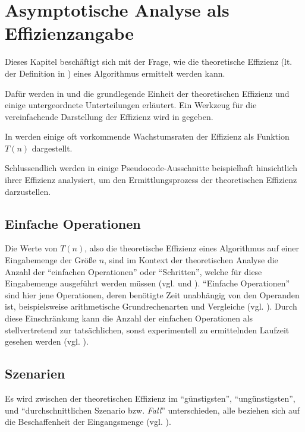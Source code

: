 \chapter{Asymptotische Analyse als Effizienzangabe}
\label{cha:asymptotic-analysis}

Dieses Kapitel beschäftigt sich mit der Frage, wie die theoretische Effizienz (lt. der Definition in ) eines Algorithmus ermittelt werden kann.

Dafür werden in  und  die grundlegende Einheit der theoretischen Effizienz und einige untergeordnete Unterteilungen erläutert. Ein Werkzeug für die vereinfachende Darstellung der Effizienz wird in  gegeben.

In  werden einige oft vorkommende Wachstumsraten der Effizienz als Funktion $T(n)$ dargestellt.

Schlussendlich werden in  einige Pseudocode-Ausschnitte beispielhaft hinsichtlich ihrer Effizienz analysiert, um den Ermittlungsprozess der theoretischen Effizienz darzustellen.

\section{Einfache Operationen}
\label{sec:einfache-operationen}

Die Werte von $T(n)$, also die theoretische Effizienz eines Algorithmus auf einer Eingabemenge der Größe $n$, sind im Kontext der theoretischen Analyse die Anzahl der \enquote{einfachen Operationen} oder \enquote{Schritten}, welche für diese Eingabemenge ausgeführt werden müssen (vgl. \cite[25]{clrs2001} und \cite[18f]{hsr1997}). \enquote{Einfache Operationen} sind hier jene Operationen, deren benötigte Zeit unabhängig von den Operanden ist, beispielsweise arithmetische Grundrechenarten und Vergleiche (vgl. \cite[55]{sha2011}). Durch diese Einschränkung kann die Anzahl der einfachen Operationen als stellvertretend zur tatsächlichen, sonst experimentell zu ermittelnden Laufzeit gesehen werden (vgl. \cite[55]{sha2011}).

\section{Szenarien}
\label{sec:asymptotic-cases}

Es wird zwi\-schen der theoretischen Effizienz im \enquote{günstigsten}, \enquote{ungünstigsten}, und \enquote{durchschnittlichen Szenario bzw. \emph{Fall}} unterschieden, alle beziehen sich auf die Beschaffenheit der Eingangsmenge (vgl. \cite[28]{hsr1997}).

